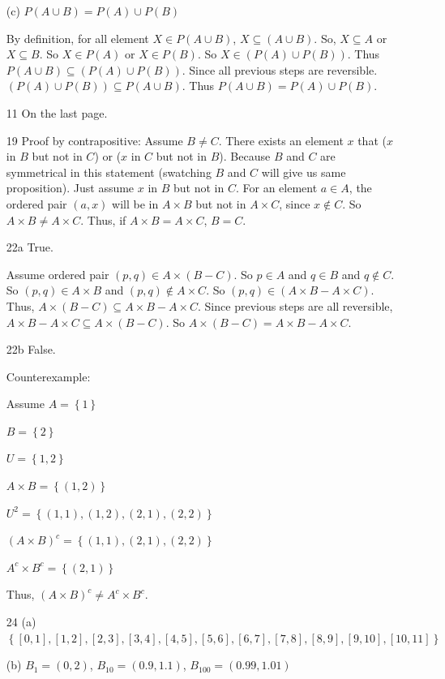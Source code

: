 \documentclass[a4paper]{article}
\begin{document}
\begin{enumerate}
(c) $P(A \cup B)= P(A) \cup P(B)$


By definition, for all element $X \in P(A \cup B)$, $X \subseteq (A \cup B)$. So, $X \subseteq A$ or $X \subseteq B$. So $X \in P(A)$ or $X \in P(B)$. So $X \in (P(A) \cup P(B)) $. Thus $P(A \cup B) \subseteq (P(A) \cup P(B))$. Since all previous steps are reversible. $(P(A) \cup P(B)) \subseteq P(A \cup B)$. Thus $P(A \cup B) = P(A) \cup P(B)$.




\item[11]
On the last page. 
   
   
\item[19]
Proof by contrapositive:
Assume $B \neq C$. There exists an element $x$ that ($x$ in $B$ but not in $C$) or ($x$ in $C$ but not in $B$). Because $B$ and $C$ are symmetrical in this statement (swatching $B$ and $C$ will give us same proposition). Just assume $x$ in $B$ but not in $C$. For an element $a \in A$, the ordered pair $(a,x)$ will be in $A \times B$ but not in $A \times C$, since $x \notin C$. So $A \times B \neq A\times C$. Thus, if $A \times B= A\times C$, $B = C$.


\item[22a]
True.


Assume ordered pair $(p,q) \in A \times (B-C)$. So $p \in A$ and $q \in B$ and $q \notin C$. So $(p,q) \in A \times B$ and $(p,q) \notin A \times C$. So $(p,q) \in (A \times B - A\times C)$. Thus, $A \times (B-C) \subseteq A \times B - A\times C$. Since previous steps are all reversible, $A \times B - A\times C\subseteq A \times (B-C)$. So $A \times (B-C) = A \times B - A\times C$.   

\item[22b]
False.


Counterexample: 


Assume $A=\left\{{1}\right\}$


$B=\left\{{2}\right\}$


$U=\left\{{1,2}\right\}$


$A \times B =\left\{{(1,2)}\right\}$


$U^2=\left\{{(1,1),(1,2),(2,1),(2,2)}\right\}$


$(A \times B)^{c}=\left\{{(1,1),(2,1),(2,2)}\right\}$


$A^{c} \times B^{c}=\left\{{(2,1)}\right\}$


Thus, $(A \times B)^{c} \neq A^{c} \times B^{c}$.


\item[24]
(a)$\left\{{[0,1],[1,2],[2,3],[3,4],[4,5],[5,6],[6,7],[7,8],[8,9],[9,10],[10,11]}\right\}$


(b) $B_{1}=(0,2)$, $B_{10}=(0.9,1.1)$, $B_{100}=(0.99,1.01)$

\end{enumerate}
\end{document}
